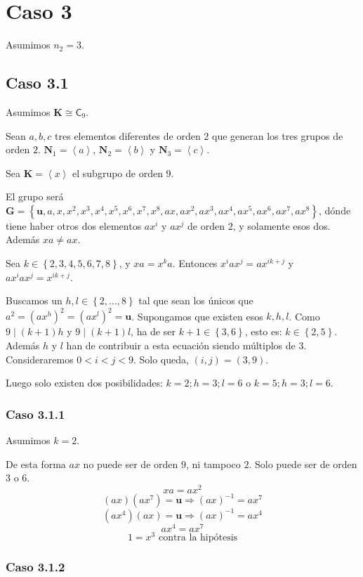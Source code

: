 \documentclass[final,12pt,a4paper,twoside,fleqn]{extbook}
\newcommand{\entreangulos}[1]{\ensuremath{\left\langle{#1}\right\rangle}}
\newcommand{\set}[1]{\ensuremath{\left\lbrace{#1}\right\rbrace}}
\newcommand{\generadoporUitem}[1]{\ensuremath{
        \entreangulos{#1}
}}
\newcommand{\generadopor}[1]{\ensuremath{
        \generadoporUitem{#1}
}}
\newcommand{\grG}{\ensuremath{\mathbf{G}}}
\newcommand{\grK}{\ensuremath{\mathbf{K}}}
\newcommand{\grN}{\ensuremath{\mathbf{N}}}
\newcommand{\grclass}[1]{\ensuremath{\mathsf{#1}}}
\newcommand{\cyclicgr}[1]{\ensuremath{{\grclass{C}}_{#1}}}
\newcommand{\neutromult}{\ensuremath{\mathbf{u}}}
\newcommand{\unity}{\ensuremath{\neutromult}}
\theoremstyle{definition}
\theoremstyle{remark}
\begin{document}
\section{Caso 3}

Asumimos $n_2 = 3$.



\subsection{Caso 3.1}

Asumimos $\grK       \cong       \cyclicgr{9}$.

Sean $a,b,c$ tres elementos diferentes de orden $2$ que generan los tres grupos de orden $2$.
$\grN_1 = \generadopor{a}$, $\grN_2 = \generadopor{b}$ y $\grN_3 = \generadopor{c}$.

Sea $\grK=\generadopor{x}$ el subgrupo de orden $9$.

El grupo ser\'a $\grG=\set{\unity,a,x,x^2,x^3,x^4,x^5,x^6,x^7,x^8,ax,ax^2,ax^3,ax^4,ax^5,ax^6,ax^7,ax^8}$,
d\'onde tiene haber otros dos elementos $ax^i$ y $ax^j$ de orden $2$, y solamente esos dos.
Adem\'as $xa       \neq        ax$.

Sea $k       \in \set{2,3,4,5,6,7,8}$, y $xa=x^ka$. Entonces $x^iax^j=ax^{ik+j}$ y $ax^iax^j=x^{ik+j}$.

Buscamos un $h,l       \in \set{2,\ldots,8}$ tal que sean los \'unicos que $a^2=(ax^h)^2=(ax^l)^2=\unity$.
Supongamos que existen esos $k,h,l$. Como $9 ∣(k+1)h$ y $9 ∣(k+1)l$, ha de ser $k+1      \in \set{3,6}$,
esto es: $k      \in \set{2,5}$. Adem\'as $h$ y $l$ han de contribuir a esta ecuaci\'on siendo m\'ultiplos de $3$.
Consideraremos $0<i<j<9$. Solo queda, $(i,j)=(3,9)$.

Luego solo existen dos posibilidades: $k=2;h=3;l=6$ o $k=5;h=3;l=6$.

\subsubsection{Caso 3.1.1}

Asumimos $k=2$.


De esta forma $ax$ no puede ser de orden $9$, ni tampoco $2$. Solo puede ser de orden $3$ o $6$.
\[
  xa=ax^2
\]
\[
  (ax)(ax^7)=\unity       \Rightarrow       {(ax)}^{-1}=ax^7
\]
\[
  (ax^4)(ax)=\unity       \Rightarrow       {(ax)}^{-1}=ax^4
\]
\[
  ax^4=ax^7
\]
\[
  1=x^3 \mbox{  contra la hip\'otesis}
\]



\subsubsection{Caso 3.1.2}
\end{document}
